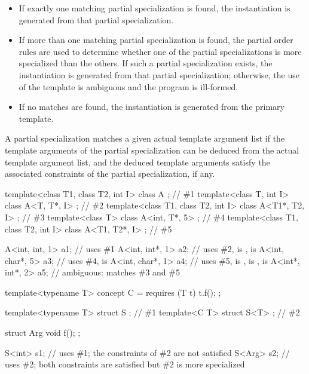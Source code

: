 \begin{itemize}
\item
If exactly one matching partial specialization is found, the instantiation is
generated from that partial specialization.
\item
If more than one matching partial specialization is found,
the partial order rules are used to determine
whether one of the partial specializations is more specialized than the
others.
If such a partial specialization exists,
the instantiation is generated from that partial specialization;
otherwise, the use of the template is ambiguous and the program is ill-formed.
\item
If no matches are found, the instantiation is generated from the
primary template.
\end{itemize}

\pnum
A partial specialization matches a given actual template argument
list if the template arguments of the partial specialization can be
deduced from the actual template argument list,
and the deduced template arguments satisfy the associated constraints
of the partial specialization, if any.
\begin{example}
\begin{codeblock}
template<class T1, class T2, int I> class A             { };    // \#1
template<class T, int I>            class A<T, T*, I>   { };    // \#2
template<class T1, class T2, int I> class A<T1*, T2, I> { };    // \#3
template<class T>                   class A<int, T*, 5> { };    // \#4
template<class T1, class T2, int I> class A<T1, T2*, I> { };    // \#5

A<int, int, 1>   a1;                    // uses \#1
A<int, int*, 1>  a2;                    // uses \#2,  is ,  is 
A<int, char*, 5> a3;                    // uses \#4,  is 
A<int, char*, 1> a4;                    // uses \#5,  is ,  is ,  is 
A<int*, int*, 2> a5;                    // ambiguous: matches \#3 and \#5
\end{codeblock}
\end{example}
\begin{example}
\begin{codeblock}
template<typename T> concept C = requires (T t) { t.f(); };

template<typename T> struct S { };      // \#1
template<C T> struct S<T> { };          // \#2

struct Arg { void f(); };

S<int> s1;                              // uses \#1; the constraints of \#2 are not satisfied
S<Arg> s2;                              // uses \#2; both constraints are satisfied but \#2 is more specialized
\end{codeblock}
\end{example}


